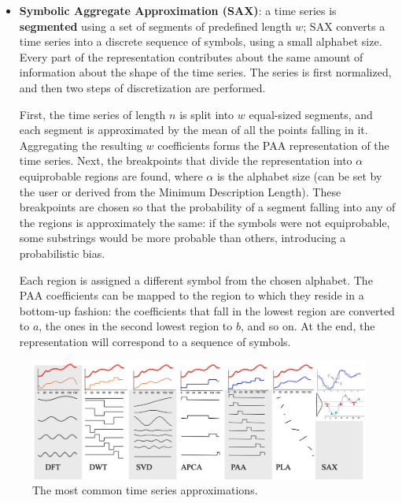 \begin{itemize}
    \item \textbf{Symbolic Aggregate Approximation (SAX)}: a time series is \textbf{segmented} using a set of segments of predefined length $w$; SAX converts a time series into a discrete sequence of symbols, using a small alphabet size. Every part of the representation contributes about the same amount of information about the shape of the time series. The series is first normalized, and then two steps of discretization are performed.

    First, the time series of length $n$ is split into $w$ equal-sized segments, and each segment is approximated by the mean of all the points falling in it. Aggregating the resulting $w$ coefficients forms the PAA representation of the time series. Next, the breakpoints that divide the representation into $\alpha$ equiprobable regions are found, where $\alpha$ is the alphabet size (can be set by the user or derived from the Minimum Description Length). These breakpoints are chosen so that the probability of a segment falling into any of the regions is approximately the same: if the symbols were not equiprobable, some substrings would be more probable than others, introducing a probabilistic bias.

    Each region is assigned a different symbol from the chosen alphabet. The PAA coefficients can be mapped to the region to which they reside in a bottom-up fashion: the coefficients that fall in the lowest region are converted to $a$, the ones in the second lowest region to $b$, and so on. At the end, the representation will correspond to a sequence of symbols.
\end{itemize}
\clearpage
\begin{figure}[ht]
    \centering
    \includegraphics[width=1.0\linewidth]{img/approximations.png}
    \caption{The most common time series approximations.}
    \label{fig:approx-ts}
\end{figure}